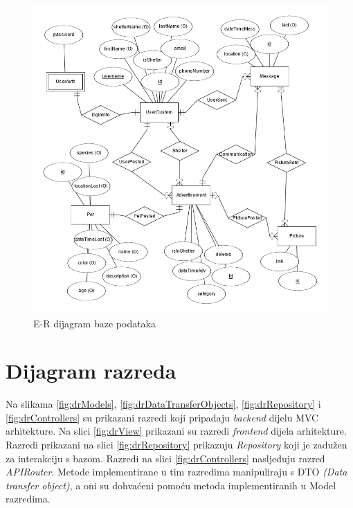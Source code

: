 				\begin{figure}[H]
					\includegraphics[scale=0.65]{dijagrami/dijagramBaze/ERmodel.PNG} %
					\centering
					\caption{E-R dijagram baze podataka}
					\label{fig:erDijagram}
				\end{figure}

			\eject
			
			
		\section{Dijagram razreda}
		
			Na slikama \ref{fig:drModels}, \ref{fig:drDataTransferObjects}, \ref{fig:drRepository} i \ref{fig:drControllers} su prikazani razredi koji pripadaju \textit{backend} dijelu MVC arhitekture. Na slici \ref{fig:drView} prikazani su razredi \textit{frontend} dijela arhitekture. Razredi prikazani na slici \ref{fig:drRepository} prikazuju \textit{Repository} koji je zadužen za interakciju s bazom. Razredi na slici \ref{fig:drControllers} nasljeđuju razred \textit{APIRouter}. Metode implementirane u tim razredima manipuliraju s DTO \textit{(Data transfer object)}, a oni su dohvaćeni pomoću metoda implementiranih u Model razredima.

